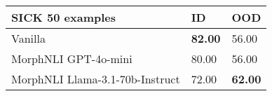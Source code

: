 \begin{tabularx}{1.2\linewidth}{ l *{2}{Z} }
\hline
\textbf{SICK 50 examples} & \textbf{ID}& \textbf{OOD} \\
\hline
Vanilla  & \textbf{82.00} & 56.00 \\
MorphNLI GPT-4o-mini & 80.00 & 56.00 \\
MorphNLI Llama-3.1-70b-Instruct & 72.00 & \textbf{62.00} \\

\hline
\end{tabularx}